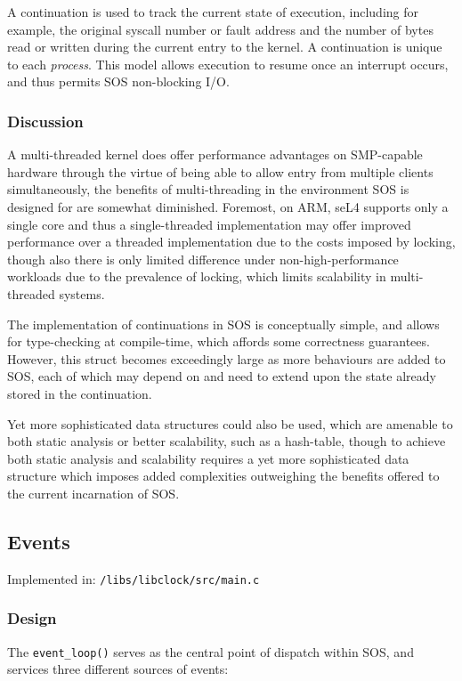 \documentclass[a4paper,12pt]{article}
\begin{document}
A continuation is used to track the current state of execution, including for
example, the original syscall number or fault address and the number of bytes
read or written during the current entry to the kernel.  A continuation is
unique to each \emph{process}.  This model allows execution to resume once an
interrupt occurs, and thus permits SOS non-blocking I/O.

\subsubsection{Discussion}
A multi-threaded kernel does offer performance advantages on SMP-capable
hardware through the virtue of being able to allow entry from multiple clients
simultaneously, the benefits of multi-threading in the environment SOS is
designed for are somewhat diminished.  Foremost, on ARM, seL4 supports only a
single core and thus a single-threaded implementation may offer improved
performance over a threaded implementation due to the costs imposed by
locking, though also there is only limited difference under
non-high-performance workloads due to the prevalence of locking, which limits
scalability in multi-threaded systems.

The implementation of continuations in SOS is conceptually simple, and allows
for type-checking at compile-time, which affords some correctness guarantees.
However, this struct becomes exceedingly large as more behaviours are added to
SOS, each of which may depend on and need to extend upon the state already
stored in the continuation.

Yet more sophisticated data structures could also be used, which are amenable
to both static analysis or better scalability, such as a hash-table, though to
achieve both static analysis and scalability requires a yet more sophisticated
data structure which imposes added complexities outweighing the benefits
offered to the current incarnation of SOS.

\subsection{Events}
Implemented in: \texttt{/libs/libclock/src/main.c}

\subsubsection{Design}
The \texttt{event\_loop()} serves as the central point of dispatch within SOS, and
services three different sources of events:
\end{document}
